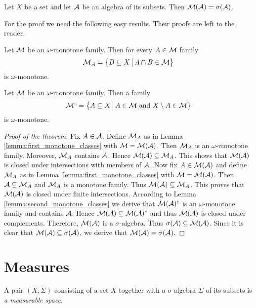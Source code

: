 \begin{theorem}\label{theorem:monotone_classes}
Let $X$ be a set and let ${\mathcal A}$ be an algebra of its subsets. Then ${\mathcal M}({\mathcal A})=\sigma({\mathcal A})$.
\end{theorem}
\noindent
For the proof we need the following easy results. Their proofs are left to the reader.

\begin{lemma}\label{lemma:first_monotone_classes}
Let ${\mathcal M}$ be an $\omega$-monotone family. Then for every $A \in {\mathcal M}$ family
$${\mathcal M}_A = \big\{B\subseteq X\,\big|\,A\cap B\in {\mathcal M}\big\}$$
is $\omega$-monotone.
\end{lemma}

\begin{lemma}\label{lemma:second_monotone_classes}
Let ${\mathcal M}$ be an $\omega$-monotone family. Then a family
$${\mathcal M}^c= \big\{A \subseteq X \,\big|\,A\in {\mathcal M}\mbox{ and }X\setminus A\in {\mathcal M}\big\}$$
is $\omega$-monotone.
\end{lemma}

\begin{proof}[Proof of the theorem]
Fix $A\in {\mathcal A}$. Define ${\mathcal M}_A$ as in Lemma \ref{lemma:first_monotone_classes} with ${\mathcal M} = {\mathcal M}({\mathcal A})$. Then ${\mathcal M}_A$ is an $\omega$-monotone family. Moreover, ${\mathcal M}_A$ contains ${\mathcal A}$. Hence ${\mathcal M}({\mathcal A})\subseteq {\mathcal M}_A$. This shows that ${\mathcal M}({\mathcal A})$ is closed under intersections with members of ${\mathcal A}$. Now fix $A\in {\mathcal M}({\mathcal A})$ and define ${\mathcal M}_A$ as in Lemma \ref{lemma:first_monotone_classes} with ${\mathcal M} = {\mathcal M}({\mathcal A})$. Then ${\mathcal A} \subseteq {\mathcal M}_A$ and ${\mathcal M}_A$ is a monotone family. Thus ${\mathcal M}({\mathcal A})\subseteq {\mathcal M}_A$. This proves that ${\mathcal M}({\mathcal A})$ is closed under finite intersections. According to Lemma \ref{lemma:second_monotone_classes} we derive that ${\mathcal M}({\mathcal A})^c$ is an $\omega$-monotone family and contains ${\mathcal A}$. Hence ${\mathcal M}({\mathcal A})\subseteq {\mathcal M}({\mathcal A})^c$ and thus ${\mathcal M}({\mathcal A})$ is closed under complements. Therefore, ${\mathcal M}({\mathcal A})$ is a $\sigma$-algebra. Thus $\sigma({\mathcal A})\subseteq {\mathcal M}({\mathcal A})$. Since it is clear that ${\mathcal M}({\mathcal A}) \subseteq \sigma({\mathcal A})$, we derive that ${\mathcal M}({\mathcal A}) = \sigma({\mathcal A})$.
\end{proof}

\section{Measures}

\begin{definition}
A pair $(X,\Sigma)$ consisting of a set $X$ together with a $\sigma$-algebra $\Sigma$ of its subsets is \textit{a measurable space}.
\end{definition}

